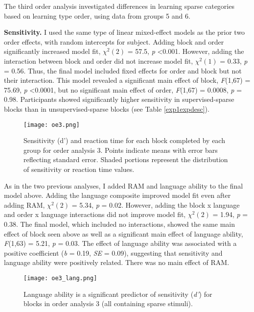 \documentclass[../dissertation.tex]{subfiles}
\begin{document}
	The third order analysis investigated differences in learning sparse categories based on learning type order, using data from groups 5 and 6. \par 	
	\textbf{Sensitivity.} I used the same type of linear mixed-effect models as the prior two order effects, with random intercepts for subject. Adding block and order significantly increased model fit, $\chi^{2}(2)$ = 57.5, \textit{p} \textless 0.001. However, adding the interaction between block and order did not increase model fit, $\chi^{2}(1)$ = 0.33, \textit{p} = 0.56. Thus, the final model included fixed effects for order and block but not their interaction. This model revealed a significant main effect of block, \textit{F}(1,67) = 75.69, \textit{p} \textless 0.0001, but no significant main effect of order, \textit{F}(1,67) = 0.0008, \textit{p} = 0.98. Participants showed significantly higher sensitivity in supervised-sparse blocks than in unsupervised-sparse blocks (see Table \ref{exp1expdesc}). \par 
	
\begin{wrapfigure}{R}{0.55\textwidth}
\vspace{-10pt}
\texttt{[image: oe3.png]}
\caption[Sensitivity and reaction time for order analysis 3]{Sensitivity (d')  and reaction time for each block completed by each group for order analysis 3. Points indicate means with error bars reflecting standard error. Shaded portions represent the distribution of sensitivity or reaction time values.}
\label{oe3}
\vspace{-15pt}
\end{wrapfigure}			
	
	As in the two previous analyses, I added RAM and language ability to the final model above. Adding the language composite improved model fit even after adding RAM, $\chi^{2}(2)$ = 5.34, \textit{p} = 0.02. However, adding the block x language and order x language interactions did not improve model fit, $\chi^{2}(2)$ = 1.94, \textit{p} = 0.38. The final model, which included no interactions, showed the same main effect of block seen above as well as a significant main effect of language ability, \textit{F}(1,63) = 5.21, \textit{p} = 0.03. The effect of language ability was associated with a positive coefficient (\textit{b} = 0.19, \textit{SE} = 0.09), suggesting that sensitivity and language ability were positively related. There was no main effect of RAM. \par 
	
	
\begin{wrapfigure}{L}{0.45\textwidth}
\vspace{-10pt}
\texttt{[image: oe3\_lang.png]}
\caption[Relationship between language ability and accuracy for order analysis 3]{Language ability is a significant predictor of sensitivity (\textit{d'}) for blocks in order analysis 3 (all containing sparse stimuli). }
\label{oe3_lang}
\vspace{-20pt}
\end{wrapfigure}	
\end{document}
